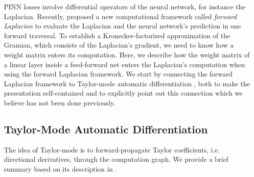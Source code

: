PINN losses involve differential operators of the neural network, for instance the Laplacian.
Recently, \citet{li2023forward} proposed a new computational framework called \emph{forward Laplacian} to evaluate the Laplacian and the neural network's prediction in one forward traversal.
To establish a Kronecker-factorized approximation of the Gramian, which consists of the Laplacian's gradient, we need to know how a weight matrix enters its computation.
Here, we describe how the weight matrix of a linear layer inside a feed-forward net enters the Laplacian's computation when using the forward Laplacian framework.
We start by connecting the forward Laplacian framework to Taylor-mode automatic differentiation \citep{griewank2008evaluating,bettencourt2019taylor}, both to make the presentation self-contained and to explicitly point out this connection which we believe has not been done previously.

\subsection{Taylor-Mode Automatic Differentiation}\label{sec:taylor-mode-tutorial}
The idea of Taylor-mode is to forward-propagate Taylor coefficients, i.e.\,directional derivatives, through the computation graph. We provide a brief summary based on its description in \cite{bettencourt2019taylor}.

